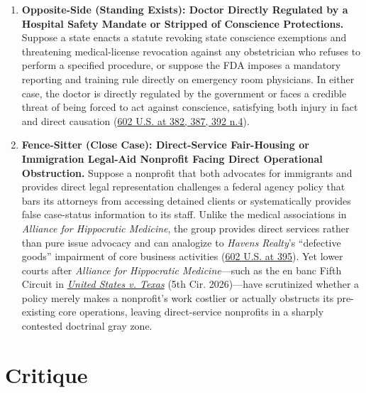 \documentclass[12pt]{article}
\begin{document}
\begin{enumerate}
\item \textbf{Opposite-Side (Standing Exists): Doctor Directly Regulated by a Hospital Safety Mandate or Stripped of Conscience Protections.} Suppose a state enacts a statute revoking state conscience exemptions and threatening medical-license revocation against any obstetrician who refuses to perform a specified procedure, or suppose the FDA imposes a mandatory reporting and training rule directly on emergency room physicians. In either case, the doctor is directly regulated by the government or faces a credible threat of being forced to act against conscience, satisfying both injury in fact and direct causation (\href{https://www.supremecourt.gov/opinions/23pdf/602us1r35_bqmd.pdf}{602 U.S. at 382, 387, 392 n.4}).

\item \textbf{Fence-Sitter (Close Case): Direct-Service Fair-Housing or Immigration Legal-Aid Nonprofit Facing Direct Operational Obstruction.} Suppose a nonprofit that both advocates for immigrants and provides direct legal representation challenges a federal agency policy that bars its attorneys from accessing detained clients or systematically provides false case-status information to its staff. Unlike the medical associations in \textit{Alliance for Hippocratic Medicine}, the group provides direct services rather than pure issue advocacy and can analogize to \textit{Havens Realty}'s ``defective goods'' impairment of core business activities (\href{https://www.supremecourt.gov/opinions/23pdf/602us1r35_bqmd.pdf}{602 U.S. at 395}). Yet lower courts after \textit{Alliance for Hippocratic Medicine}---such as the en banc Fifth Circuit in \href{https://law.justia.com/cases/federal/appellate-courts/ca5/24-50149/24-50149-2026-04-24.html}{\textit{United States v. Texas}} (5th Cir. 2026)---have scrutinized whether a policy merely makes a nonprofit's work costlier or actually obstructs its pre-existing core operations, leaving direct-service nonprofits in a sharply contested doctrinal gray zone.
\end{enumerate}

\section{Critique}
\end{document}
